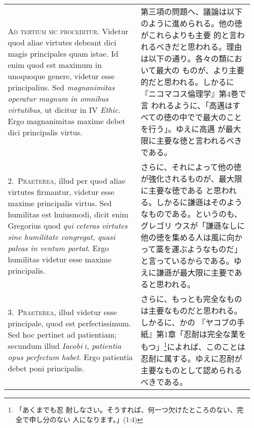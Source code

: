 \documentclass[10pt]{jsarticle}
\begin{document}
\begin{longtable}{p{21em}p{21em}}
{\scshape Ad tertium sic proceditur}. Videtur quod aliae virtutes
debeant dici magis principales quam istae. Id enim quod est maximum in
unoquoque genere, videtur esse principalius. Sed {\itshape
magnanimitas operatur magnum in omnibus virtutibus}, ut dicitur in IV
{\itshape Ethic}. Ergo magnanimitas maxime debet dici principalis
virtus.

 
&

第三項の問題へ、議論は以下のように進められる。他の徳がこれらよりも主要
的と言われるべきだと思われる。理由は以下の通り。各々の類において最大の
ものが、より主要的だと思われる。しかるに『ニコマコス倫理学』第4巻で言
われるように、「高邁はすべての徳の中でで最大のことを行う」。ゆえに高邁
が最大限に主要な徳と言われるべきである。
 
\\



2.~{\scshape Praeterea}, illud per quod aliae virtutes firmantur,
videtur esse maxime principalis virtus. Sed humilitas est huiusmodi,
dicit enim Gregorius quod {\itshape qui ceteras virtutes sine
humilitate congregat, quasi paleas in ventum portat}. Ergo humilitas
videtur esse maxime principalis.

 
&

 さらに、それによって他の徳が強化されるものが、最大限に主要な徳である
 と思われる。しかるに謙遜はそのようなものである。というのも、グレゴリ
 ウスが「謙遜なしに他の徳を集める人は風に向かって藁を運ぶようなものだ」
 と言っているからである。ゆえに謙遜が最大限に主要であると思われる。

 
\\



3.~{\scshape Praeterea}, illud videtur esse principale, quod est
perfectissimum. Sed hoc pertinet ad patientiam; secundum illud
{\itshape Iacobi} {\scshape i}, {\itshape patientia opus perfectum
habet}. Ergo patientia debet poni principalis.

 
&

 さらに、もっとも完全なものは主要なものだと思われる。しかるに、かの
 『ヤコブの手紙』第1章「忍耐は完全な業をもつ」\footnote{「あくまでも忍
 耐しなさい。そうすれば、何一つ欠けたところのない、完全で申し分のない
 人になります。」(1:4)}によれば、このことは忍耐に属する。ゆえに忍耐が
 主要なものとして認められるべきである。

 
\\




\end{longtable}
\end{document}
